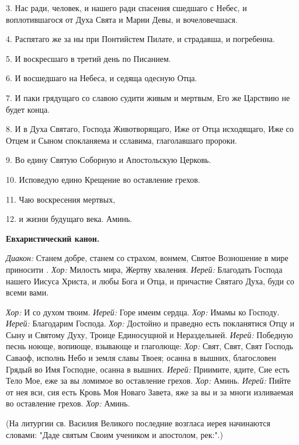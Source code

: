   3. Нас ради, человек, и нашего ради спасения сшедшаго с Небес, и воплотившагося от Духа Свята и Марии Девы, и вочеловечшася.

  4. Распятаго же за ны при Понтийстем Пилате, и страдавша, и погребенна.

  5. И воскресшаго в третий день по Писанием.

  6. И восшедшаго на Небеса, и седяща одесную Отца.

  7. И паки грядущаго со славою судити живым и мертвым, Его же Царствию не будет конца.

  8. И в Духа Святаго, Господа Животворящаго, Иже от Отца исходящаго, Иже со Отцем и Сыном спокланяема и сславима, глаголавшаго пророки.

  9. Во едину Святую Соборную и Апостольскую Церковь.

  10. Исповедую едино Крещение во оставление грехов.

  11. Чаю воскресения мертвых,

  12. и жизни будущаго века. Аминь. 

{\bfseries  Евхаристический канон. }

{\itshape  Диакон:} Станем добре, станем со страхом, вонмем, Святое Возношение в мире приносити
{\itshape . 
  Хор:} Милость мира, Жертву хваления. 
{\itshape 
  Иерей:} Благодать Господа нашего Иисуса Христа, и любы Бога и Отца, и причастие Святаго Духа, буди со всеми вами.

{\itshape Хор:} И со духом твоим. 
{\itshape 
  Иерей:} Горе имеим сердца. 
{\itshape 
  Хор:} Имамы ко Господу. 
{\itshape 
  Иерей:} Благодарим Господа. 
{\itshape 
  Хор:} Достойно и праведно есть покланятися Отцу и Сыну и Святому Духу, Троице Единосущной и Нераздельней. {\itshape  Иерей:} Победную песнь ноюще, вопиюще, взывающе и глаголюще: 
{\itshape 
  Хор:} Свят, Свят, Свят Господь Саваоф, исполнь Небо и земля славы Твоея; осанна в вышних, благословен Грядый во Имя Господне, осанна в вышних. 
{\itshape 
  Иерей:} Приимите, ядите, Сие есть Тело Мое, еже за вы ломимое во оставление грехов. 
{\itshape 
  Хор:} Аминь. {\itshape  Иерей:} Пийте от нея вси, сия есть Кровь Моя Новаго Завета, яже за вы и за многи изливаемая во оставление грехов. {\itshape  Хор:} Аминь. 

  (На литургии св. Василия Великого последние возгласа иерея начинаются словами: "Даде святым Своим учеником и апостолом, рек:".)

